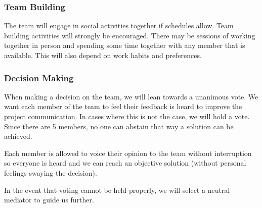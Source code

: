 \documentclass{article}
\begin{document}
\subsubsection*{Team Building}

The team will engage in social activities together if schedules allow. Team building activities will strongly be encouraged.
There may be sessions of working together in person and spending some time together with any member that is available.
This will also depend on work habits and preferences.

\subsubsection*{Decision Making} 

When making a decision on the team, we will lean towards a unanimous vote. We 
want each member of the team to feel their feedback is heard to improve the project 
communication. In cases where this is not the case, we will hold a vote. Since there 
are 5 members, no one can abstain that way a solution can be achieved. 


Each member is allowed to voice their opinion to the team without interruption so 
everyone is heard and we can reach an objective solution (without personal feelings 
swaying the decision). 


In the event that voting cannot be held properly, we will select a neutral mediator to 
guide us further.
\end{document}

